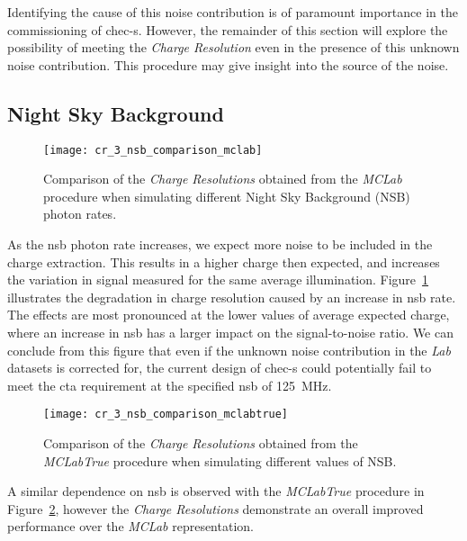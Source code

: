 Identifying the cause of this noise contribution is of paramount importance in the commissioning of \gls{chec-s}. However, the remainder of this section will explore the possibility of meeting the \textit{Charge Resolution} even in the presence of this unknown noise contribution. This procedure may give insight into the source of the noise.

\subsection{Night Sky Background}

\begin{figure}[H]
	\centering
    \texttt{[image: cr\_3\_nsb\_comparison\_mclab]} 
	\caption[Comparison of the \textit{Charge Resolution} at different NSBs.]{Comparison of the \textit{Charge Resolutions} obtained from the \textit{MCLab} procedure when simulating different Night Sky Background (NSB) photon rates.}
	\label{fig:cr_3_nsb_comparison_mclab}
\end{figure}

As the \gls{nsb} photon rate increases, we expect more noise to be included in the charge extraction. This results in a higher charge then expected, and increases the variation in signal measured for the same average illumination. Figure~\ref{fig:cr_3_nsb_comparison_mclab} illustrates the degradation in charge resolution caused by an increase in \gls{nsb} rate. The effects are most pronounced at the lower values of average expected charge, where an increase in \gls{nsb} has a larger impact on the signal-to-noise ratio. We can conclude from this figure that even if the unknown noise contribution in the \textit{Lab} datasets is corrected for, the current design of \gls{chec-s} could potentially fail to meet the \gls{cta} requirement at the specified \gls{nsb} of \SI{125}{MHz}.

\begin{figure}
	\centering
    \texttt{[image: cr\_3\_nsb\_comparison\_mclabtrue]} 
	\caption[Comparison of the \textit{Charge Resolution} at different NSBs using the \textit{MCLabTrue} procedure.]{Comparison of the \textit{Charge Resolutions} obtained from the \textit{MCLabTrue} procedure when simulating different values of NSB.}
	\label{fig:cr_3_nsb_comparison_mclabtrue}
\end{figure}

A similar dependence on \gls{nsb} is observed with the \textit{MCLabTrue} procedure in Figure~\ref{fig:cr_3_nsb_comparison_mclabtrue}, however the \textit{Charge Resolutions} demonstrate an overall improved performance over the \textit{MCLab} representation.

